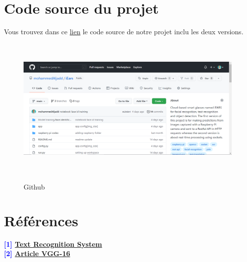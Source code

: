 {%


\pagebreak
{}
\chapter{Code source du projet}\thispagestyle{fancy}
Vous trouvez dans ce \href{https://github.com/mohammedAljadd/iEars}{lien} le code source de notre projet inclu les deux versions.\\

\begin{center}
\begin{figure}[H]
\centering
\includegraphics[width=18cm, height=7cm]{4-Images/github.PNG}\\[2cm]
\caption{Github}
\label{fig:figure11}
\end{figure}
\Large

\end{center}



\pagebreak
{}
\chapter{Références}

\textbf{\textcolor{blue}{[1]} \href{https://towardsdatascience.com/build-a-handwritten-text-recognition-system-using-tensorflow-2326a3487cd5}{Text Recognition System}}\\

\textbf{\textcolor{blue}{[2]} 
\href{ https://arxiv.org/pdf/1409.1556.pdf }{Article VGG-16}} \\

}
